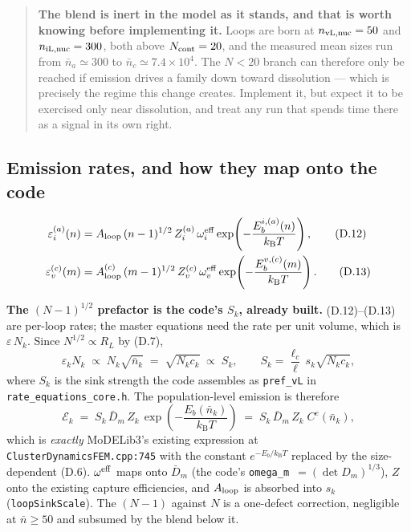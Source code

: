 \documentclass[11pt]{article}
\newcommand{\MoD}{\textsf{MoDELib3}}
\newcommand{\fbk}{\discretionary{}{}{}}   %
\newcommand{\file}[1]{\texttt{\small #1}}
\newcommand{\kB}{k_{\mathrm B}}
\begin{document}
\begin{quote}\small
\textbf{The blend is inert in the model as it stands, and that is worth
knowing before implementing it.}  Loops are born at
$n_{\rm vL,nuc}=50$ and $n_{\rm iL,nuc}=300$, both above $N_{\rm cont}=20$,
and the measured mean sizes run from $\bar n_a\simeq300$ to
$\bar n_c\simeq7.4\times10^{4}$.  The $N<20$ branch can therefore only be
reached if emission drives a family down toward dissolution --- which is
precisely the regime this change creates.  Implement it, but expect it to be
exercised only near dissolution, and treat any run that spends time there as
a signal in its own right.
\end{quote}

\subsection{Emission rates, and how they map onto the code}
\label{sec:emitmap}

\begin{align*}
\varepsilon_i^{(a)}(n)&=A_{\rm loop}\,(n-1)^{1/2}\,Z_i^{(a)}\,
  \omega_i^{\rm eff}\exp\!\left(-\frac{E_b^{i,(a)}(n)}{\kB T}\right),
\tag{D.12}\\
\varepsilon_v^{(c)}(m)&=A_{\rm loop}^{(c)}\,(m-1)^{1/2}\,Z_v^{(c)}\,
  \omega_v^{\rm eff}\exp\!\left(-\frac{E_b^{v,(c)}(m)}{\kB T}\right).
\tag{D.13}
\end{align*}

\textbf{The $(N-1)^{1/2}$ prefactor is the code's $S_k$, already built.}
(D.12)--(D.13) are per-loop rates; the master equations need the rate per unit
volume, which is $\varepsilon\,N_k$.  Since $N^{1/2}\propto R_L$ by (D.7),
\begin{equation*}
\varepsilon_k N_k \;\propto\; N_k\sqrt{\bar n_k}\;=\;\sqrt{N_k c_k}
\;\propto\; S_k,
\qquad
S_k=\frac{\ell_c}{\ell}\,s_k\sqrt{N_k c_k},
\end{equation*}
where $S_k$ is the sink strength the code assembles as \verb|pref_vL| in
\file{rate\_\fbk equations\_\fbk core.\fbk h}.  The population-level emission
is therefore
\begin{equation}
\mathcal E_k \;=\; S_k\,\bar D_m\,Z_k\,
  \exp\!\left(-\frac{E_b(\bar n_k)}{\kB T}\right)
  \;=\; S_k\,\bar D_m\,Z_k\;C^{e}(\bar n_k),
\label{eq:Ek}
\end{equation}
which is \emph{exactly} \MoD{}'s existing expression at
\file{ClusterDynamicsFEM.\fbk cpp:745} with the constant $e^{-E_b/\kB T}$
replaced by the size-dependent (D.6).  $\omega^{\rm eff}$ maps onto
$\bar D_m$ (the code's \verb|omega_m|~$=(\det D_m)^{1/3}$), $Z$ onto the
existing capture efficiencies, and $A_{\rm loop}$ is absorbed into $s_k$
(\verb|loopSinkScale|).  The $(N-1)$ against $N$ is a one-defect correction,
negligible at $\bar n\ge50$ and subsumed by the blend below it.
\end{document}

